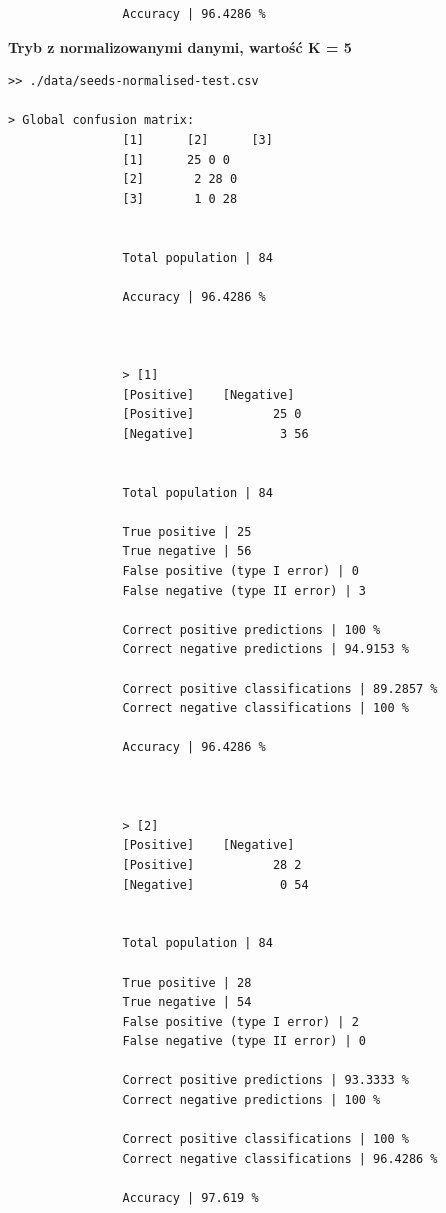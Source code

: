 \documentclass{classrep}
\begin{document}
{{{\begin{lstlisting}
                Accuracy | 96.4286 %

                \end{lstlisting}
                \textbf{Tryb z normalizowanymi danymi, wartość K = 5}
                \begin{lstlisting}
>> ./data/seeds-normalised-test.csv

> Global confusion matrix:
                [1]      [2]      [3]
                [1]      25 0 0
                [2]       2 28 0
                [3]       1 0 28


                Total population | 84

                Accuracy | 96.4286 %



                > [1]
                [Positive]    [Negative]
                [Positive]           25 0
                [Negative]            3 56


                Total population | 84

                True positive | 25
                True negative | 56
                False positive (type I error) | 0
                False negative (type II error) | 3

                Correct positive predictions | 100 %
                Correct negative predictions | 94.9153 %

                Correct positive classifications | 89.2857 %
                Correct negative classifications | 100 %

                Accuracy | 96.4286 %



                > [2]
                [Positive]    [Negative]
                [Positive]           28 2
                [Negative]            0 54


                Total population | 84

                True positive | 28
                True negative | 54
                False positive (type I error) | 2
                False negative (type II error) | 0

                Correct positive predictions | 93.3333 %
                Correct negative predictions | 100 %

                Correct positive classifications | 100 %
                Correct negative classifications | 96.4286 %

                Accuracy | 97.619 %




\end{lstlisting}}}}
\end{document}
